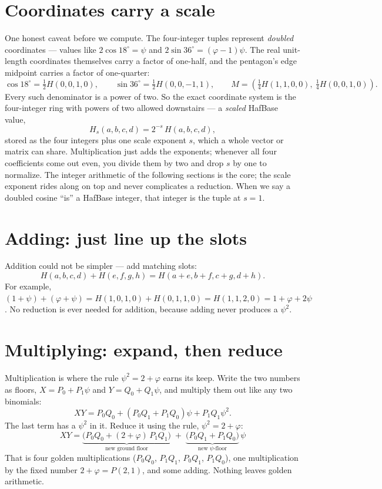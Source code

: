 \documentclass[11pt]{article}
\newcommand{\phigr}{\varphi}
\newcommand{\Hn}[4]{H(#1,#2,#3,#4)}
\newcommand{\Pn}[2]{P(#1,#2)}
\begin{document}
\section{Coordinates carry a scale}
\label{sec:scale}

One honest caveat before we compute. The four-integer tuples represent \emph{doubled} coordinates ---
values like $2\cos 18^\circ = \psi$ and $2\sin 36^\circ = (\phigr-1)\psi$. The real unit-length
coordinates themselves carry a factor of one-half, and the pentagon's edge midpoint carries a
factor of one-quarter:
\[
\cos 18^\circ = \tfrac12\Hn{0}{0}{1}{0}, \qquad
\sin 36^\circ = \tfrac12\Hn{0}{0}{-1}{1}, \qquad
M = \left(\tfrac14\Hn{1}{1}{0}{0},\ \tfrac14\Hn{0}{0}{1}{0}\right).
\]
Every such denominator is a power of two. So the exact coordinate system is the four-integer ring with
powers of two allowed downstairs --- a \emph{scaled} HafBase value,
\[
H_s(a,b,c,d) = 2^{-s}\,\Hn{a}{b}{c}{d},
\]
stored as the four integers plus one scale exponent $s$, which a whole vector or matrix can share.
Multiplication just adds the exponents; whenever all four coefficients come out even, you divide them
by two and drop $s$ by one to normalize. The integer arithmetic of the following sections is the core;
the scale exponent rides along on top and never complicates a reduction. When we say a doubled cosine ``is''
a HafBase integer, that integer is the tuple at $s = 1$.

\section{Adding: just line up the slots}

Addition could not be simpler --- add matching slots:
\[
\Hn{a}{b}{c}{d} + \Hn{e}{f}{g}{h} = \Hn{a+e}{b+f}{c+g}{d+h}.
\]
For example, $(1 + \psi) + (\phigr + \psi) = \Hn{1}{0}{1}{0} + \Hn{0}{1}{1}{0} = \Hn{1}{1}{2}{0}
= 1 + \phigr + 2\psi$. No reduction is ever needed for addition, because adding never produces a
$\psi^2$.

\section{Multiplying: expand, then reduce}

Multiplication is where the rule $\psi^2 = 2 + \phigr$ earns its keep. Write the two numbers as
floors, $X = P_0 + P_1\psi$ and $Y = Q_0 + Q_1\psi$, and multiply them out like any two binomials:
\[
XY = P_0 Q_0 + (P_0 Q_1 + P_1 Q_0)\psi + P_1 Q_1 \psi^2 .
\]
The last term has a $\psi^2$ in it. Reduce it using the rule, $\psi^2 = 2 + \phigr$:
\[
\boxed{\;XY = \underbrace{\big(P_0 Q_0 + (2+\phigr)\,P_1 Q_1\big)}_{\text{new ground floor}}
\;+\; \underbrace{\big(P_0 Q_1 + P_1 Q_0\big)}_{\text{new }\psi\text{-floor}}\,\psi\;}
\]
That is four golden multiplications ($P_0Q_0$, $P_1Q_1$, $P_0Q_1$, $P_1Q_0$), one multiplication by
the fixed number $2 + \phigr = \Pn{2}{1}$, and some adding. Nothing leaves golden arithmetic.
\end{document}
